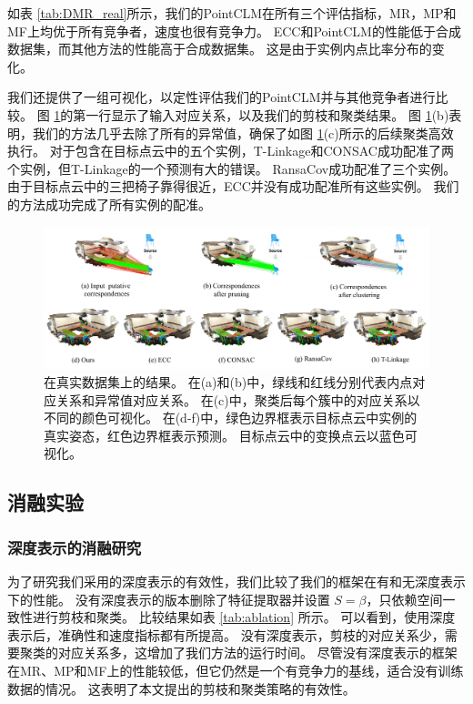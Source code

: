 如表 \ref{tab:DMR_real}所示，我们的PointCLM在所有三个评估指标，MR，MP和MF上均优于所有竞争者，速度也很有竞争力。 
ECC和PointCLM的性能低于合成数据集，而其他方法的性能高于合成数据集。 
这是由于实例内点比率分布的变化。 
      
我们还提供了一组可视化，以定性评估我们的PointCLM并与其他竞争者进行比较。 
图 \ref{fig:DMR_real}的第一行显示了输入对应关系，以及我们的剪枝和聚类结果。 
图 \ref{fig:DMR_real}(b)表明，我们的方法几乎去除了所有的异常值，确保了如图 \ref{fig:DMR_real}(c)所示的后续聚类高效执行。 
对于包含在目标点云中的五个实例，T-Linkage和CONSAC成功配准了两个实例，但T-Linkage的一个预测有大的错误。 
RansaCov成功配准了三个实例。 
由于目标点云中的三把椅子靠得很近，ECC并没有成功配准所有这些实例。 
我们的方法成功完成了所有实例的配准。
      
\begin{figure}
        \centering
        \includegraphics[width=1.0\textwidth]{images/DMR_real.pdf}
        \caption{
          在真实数据集上的结果。
          在(a)和(b)中，绿线和红线分别代表内点对应关系和异常值对应关系。
          在(c)中，聚类后每个簇中的对应关系以不同的颜色可视化。
          在(d-f)中，绿色边界框表示目标点云中实例的真实姿态，红色边界框表示预测。
          目标点云中的变换点云以蓝色可视化。
        }
        \label{fig:DMR_real}
\end{figure}
      
\subsection{消融实验}
\label{sec:ablation}
\subsubsection{深度表示的消融研究}为了研究我们采用的深度表示的有效性，我们比较了我们的框架在有和无深度表示下的性能。
没有深度表示的版本删除了特征提取器并设置 $S=\beta$，只依赖空间一致性进行剪枝和聚类。
比较结果如表 \ref{tab:ablation} 所示。
可以看到，使用深度表示后，准确性和速度指标都有所提高。
没有深度表示，剪枝的对应关系少，需要聚类的对应关系多，这增加了我们方法的运行时间。
尽管没有深度表示的框架在MR、MP和MF上的性能较低，但它仍然是一个有竞争力的基线，适合没有训练数据的情况。
这表明了本文提出的剪枝和聚类策略的有效性。

